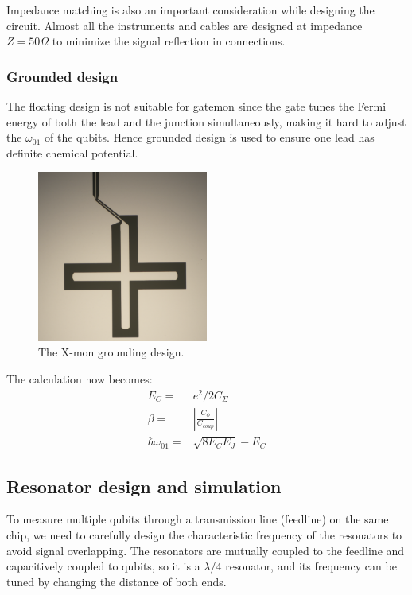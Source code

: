 Impedance matching is also an important consideration while designing the circuit. Almost all the instruments and cables are designed at impedance $Z = 50\Omega$ to minimize the signal reflection in connections.

\subsubsection{Grounded design}

The floating design is not suitable for gatemon since the gate tunes the Fermi energy of both the lead and the junction simultaneously, making it hard to adjust the $\omega_{01}$ of the qubits. Hence grounded design is used to ensure one lead has definite chemical potential. 


\begin{figure}[h!]
    \centering
    \includegraphics[width=0.5\textwidth]{Pic/Xmon_design.png}
    \caption{The X-mon grounding design.}
    \label{fig:my_label}
\end{figure}

The calculation now becomes:
\begin{equation}
    \begin{array}{cc}
    E_C =& e^2 / 2C_\Sigma \\
    \beta =& |\frac{C_\phi}{C_{coup}}| \\
    \hbar\omega_{01} =& \sqrt{8E_CE_J} - E_C
    \end{array}
\end{equation}


\subsection{Resonator design and simulation}
To measure multiple qubits through a transmission line (feedline) on the same chip, we need to carefully design the characteristic frequency of the resonators to avoid signal overlapping. The resonators are mutually coupled to the feedline and capacitively coupled to qubits, so it is a $\lambda/4$ resonator, and its frequency can be tuned by changing the distance of both ends. 

